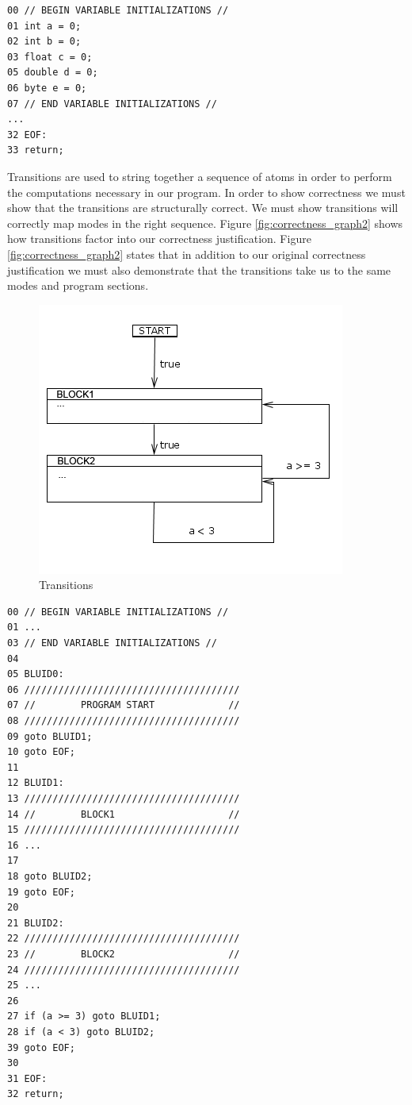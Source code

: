 \begin{lstlisting}[frame=single]
00 // BEGIN VARIABLE INITIALIZATIONS //
01 int a = 0;
02 int b = 0;
03 float c = 0;
05 double d = 0;
06 byte e = 0;
07 // END VARIABLE INITIALIZATIONS //
...
32 EOF:
33 return;
\end{lstlisting}

Transitions are used to string together a sequence of atoms in order to perform the computations necessary in our program. In order to show correctness we must show that the transitions are structurally correct. We must show transitions will correctly map modes in the right sequence. Figure \ref{fig:correctness_graph2} shows how transitions factor into our correctness justification. Figure \ref{fig:correctness_graph2} states that in addition to our original correctness justification we must also demonstrate that the transitions take us to the same modes and program sections.

\clearpage
\begin{figure}[htp]
	\centering
	\includegraphics[width=\imgmedphoto]{./images/correctness_ex_transition.png}
	\caption{Transitions}
	\label{fig:correctness_ex_transition}
\end{figure}

\begin{lstlisting}[frame=single]
00 // BEGIN VARIABLE INITIALIZATIONS //
01 ...
03 // END VARIABLE INITIALIZATIONS //
04
05 BLUID0:
06 //////////////////////////////////////
07 //        PROGRAM START             //
08 //////////////////////////////////////
09 goto BLUID1;
10 goto EOF;
11
12 BLUID1:
13 //////////////////////////////////////
14 //        BLOCK1                    //
15 //////////////////////////////////////
16 ...
17 
18 goto BLUID2;
19 goto EOF;
20
21 BLUID2:
22 //////////////////////////////////////
23 //        BLOCK2                    //
24 //////////////////////////////////////
25 ...
26
27 if (a >= 3) goto BLUID1;
28 if (a < 3) goto BLUID2;
39 goto EOF;
30
31 EOF:
32 return;
\end{lstlisting}


